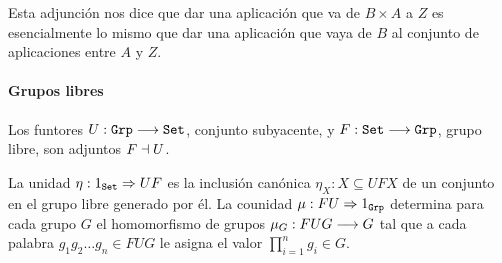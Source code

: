 Esta adjunción nos dice que dar una aplicación que va de $B\times A$ a $Z$
es esencialmente lo mismo que dar una aplicación que vaya de $B$ al conjunto
de aplicaciones entre $A$ y $Z$.
\paragraph{Grupos libres}
Los funtores $U : \texttt{Grp}\longrightarrow \texttt{Set}$, conjunto subyacente,
y $F : \texttt{Set}\longrightarrow \texttt{Grp}$, grupo libre, son adjuntos
$F \dashv U$.

La unidad $\eta : 1_{\texttt{Set}}\Rightarrow UF$ es la inclusión canónica
$\eta_X : X \subseteq UFX$ de un conjunto en el
grupo libre generado por él. La counidad
$\mu : FU\Rightarrow 1_{\texttt{Grp}}$ determina para cada grupo $G$
el homomorfismo de grupos $\mu_G : FUG\longrightarrow G$
tal que a cada palabra
$g_1g_2\ldots g_n \in FUG$ le asigna el valor $\prod_{i=1}^n g_i \in G$.

